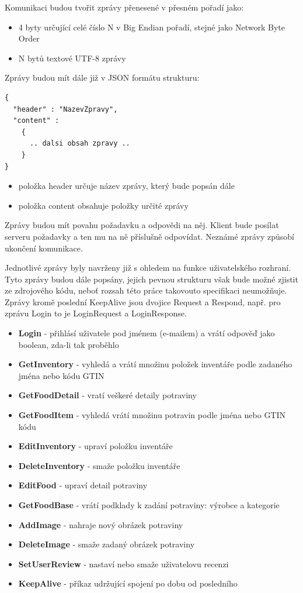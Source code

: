 \documentclass[thesis=B,czech]{FITthesis}[2013/10/20]
\begin{document}
Komunikaci budou tvořit zprávy přenesené v přesném pořadí jako:

\begin{itemize}
  \item{4 byty určující celé číslo N v Big Endian pořadí, stejné jako Network Byte Order}
  \item{N bytů textové UTF-8 zprávy}
\end{itemize}

Zprávy budou mít dále již v JSON formátu strukturu:
\begin{lstlisting}
{
  "header" : "NazevZpravy",
  "content" :
    {
      .. dalsi obsah zpravy ..
    }
}
\end{lstlisting}

\begin{itemize}
  \item{položka header určuje název zprávy, který bude popsán dále}
  \item{položka content obsahuje položky určité zprávy}
\end{itemize}

Zprávy budou mít povahu požadavku a odpovědi na něj. Klient bude posílat serveru požadavky a ten mu na ně příslušně odpovídat. Neznámé zprávy způsobí ukončení komunikace.

Jednotlivé zprávy byly navrženy již s ohledem na funkce uživatelského rozhraní. Tyto zprávy budou dále popsány, jejich pevnou strukturu však bude možné zjistit ze zdrojového kódu, neboť rozsah této práce takovouto specifikaci neumožňuje. Zprávy kromě poslední KeepAlive jsou dvojice Request a Respond, např. pro zprávu Login to je LoginRequest a LoginResponse.

\begin{itemize}
  \item{\textbf{Login} - přihlásí uživatele pod jménem (e-mailem) a vrátí odpověď jako boolean, zda-li tak proběhlo}
  \item{\textbf{GetInventory} - vyhledá a vrátí množinu položek inventáře podle zadaného jména nebo kódu GTIN}
  \item{\textbf{GetFoodDetail} - vratí veškeré detaily potraviny}
  \item{\textbf{GetFoodItem} - vyhledá vrátí množinu potravin podle jména nebo GTIN kódu}
  \item{\textbf{EditInventory} - upraví položku inventáře}
  \item{\textbf{DeleteInventory} - smaže položku inventáře}
  \item{\textbf{EditFood} - upraví detail potraviny}
  \item{\textbf{GetFoodBase} - vrátí podklady k zadání potraviny: výrobce a kategorie}
  \item{\textbf{AddImage} - nahraje nový obrázek potraviny}
  \item{\textbf{DeleteImage} - smaže zadaný obrázek potraviny}
  \item{\textbf{SetUserReview} - nastaví nebo smaže uživatelovu recenzi}
  \item{\textbf{KeepAlive} - příkaz udržující spojení po dobu od posledního}
\end{itemize}
\end{document}
